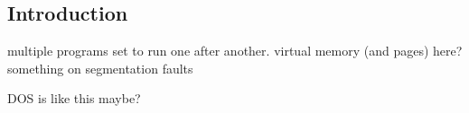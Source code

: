 
\subsection{Introduction}
 
multiple programs set to run one after another. virtual memory (and pages) here? something on segmentation faults

DOS is like this maybe?
